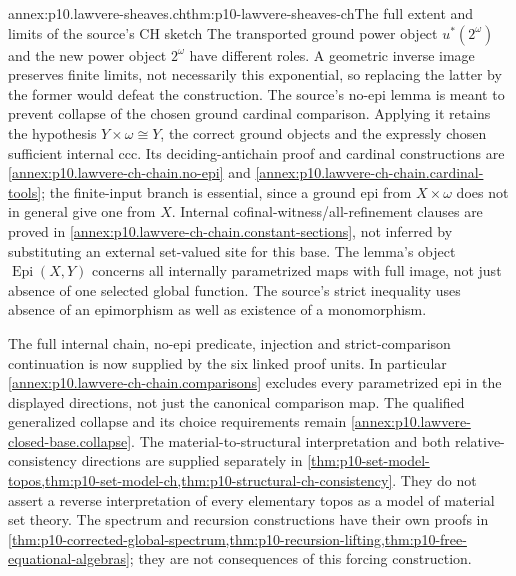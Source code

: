 \begin{annexitem}{annex:p10.lawvere-sheaves.ch}{thm:p10-lawvere-sheaves-ch}{The full extent and limits of the source's CH sketch}
The transported ground power object \(u^*(2^\omega)\) and the
new power object \(2^\omega\) have different roles.  A geometric
inverse image preserves finite limits, not necessarily this
exponential, so replacing the latter by the former would defeat the
construction.  The source's no-epi lemma is meant to prevent
collapse of the chosen ground cardinal comparison.  Applying it
retains the hypothesis \(Y\times\omega\cong Y\), the correct
ground objects and the expressly chosen sufficient internal ccc.
Its deciding-antichain proof and cardinal constructions are
\ref{annex:p10.lawvere-ch-chain.no-epi} and
\ref{annex:p10.lawvere-ch-chain.cardinal-tools}; the finite-input branch
is essential, since a ground epi from \(X\times\omega\) does not
in general give one from \(X\). Internal cofinal-witness/all-refinement
clauses are proved in \ref{annex:p10.lawvere-ch-chain.constant-sections},
not inferred by substituting an external set-valued site for this base.
The lemma's object \(\operatorname{Epi}(X,Y)\) concerns all
internally parametrized maps with full image, not just absence of
one selected global function.  The source's strict inequality uses
absence of an epimorphism as well as existence of a monomorphism.

The full internal chain, no-epi predicate, injection and strict-comparison
continuation is now supplied by the six linked proof units. In particular
\ref{annex:p10.lawvere-ch-chain.comparisons} excludes every parametrized
epi in the displayed directions, not just the canonical comparison map.
The qualified generalized collapse and its choice requirements remain
\ref{annex:p10.lawvere-closed-base.collapse}. The material-to-structural interpretation and both relative-consistency
directions are supplied separately in
\cref{thm:p10-set-model-topos,thm:p10-set-model-ch,thm:p10-structural-ch-consistency}.
They do not assert a reverse interpretation of every elementary topos
as a model of material set theory. The spectrum and recursion constructions
have their own proofs in
\cref{thm:p10-corrected-global-spectrum,thm:p10-recursion-lifting,thm:p10-free-equational-algebras};
they are not consequences of this forcing construction.
\end{annexitem}


